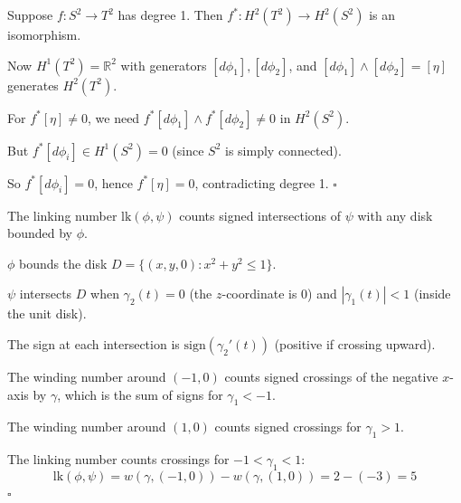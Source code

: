 \documentclass[11pt, letterpaper, openany]{book}
\newenvironment{solution}[1][Solution]{%
  \tcolorbox[blanker, breakable, left=1em,
    before skip=1em, after skip=1em,
    borderline west={2pt}{0pt}{MagicBlue},
    colback=MagicCream,
    before upper={\textcolor{MagicBlue}{\sffamily\bfseries #1.}\space}
  ]%
}{%
  \hfill\textcolor{MagicBlue}{\ensuremath{\square}}\endtcolorbox%
}
\begin{document}
\begin{solution}[No degree 1 maps $S^2 \to T^2$]
Suppose $f: S^2 \to T^2$ has degree 1. Then $f^*: H^2(T^2) \to H^2(S^2)$ is an isomorphism.

Now $H^1(T^2) = \mathbb{R}^2$ with generators $[d\phi_1], [d\phi_2]$, and $[d\phi_1] \wedge [d\phi_2] = [\eta]$ generates $H^2(T^2)$.

For $f^*[\eta] \neq 0$, we need $f^*[d\phi_1] \wedge f^*[d\phi_2] \neq 0$ in $H^2(S^2)$.

But $f^*[d\phi_i] \in H^1(S^2) = 0$ (since $S^2$ is simply connected).

So $f^*[d\phi_i] = 0$, hence $f^*[\eta] = 0$, contradicting degree 1.
\end{solution}

\begin{solution}[Linking number]
The linking number $\text{lk}(\phi, \psi)$ counts signed intersections of $\psi$ with any disk bounded by $\phi$.

$\phi$ bounds the disk $D = \{(x, y, 0) : x^2 + y^2 \leq 1\}$.

$\psi$ intersects $D$ when $\gamma_2(t) = 0$ (the $z$-coordinate is 0) and $|\gamma_1(t)| < 1$ (inside the unit disk).

The sign at each intersection is $\text{sign}(\gamma_2'(t))$ (positive if crossing upward).

The winding number around $(-1, 0)$ counts signed crossings of the negative $x$-axis by $\gamma$, which is the sum of signs for $\gamma_1 < -1$.

The winding number around $(1, 0)$ counts signed crossings for $\gamma_1 > 1$.

The linking number counts crossings for $-1 < \gamma_1 < 1$:
\[
\text{lk}(\phi, \psi) = w(\gamma, (-1,0)) - w(\gamma, (1,0)) = 2 - (-3) = 5
\]
\end{solution}
\end{document}
